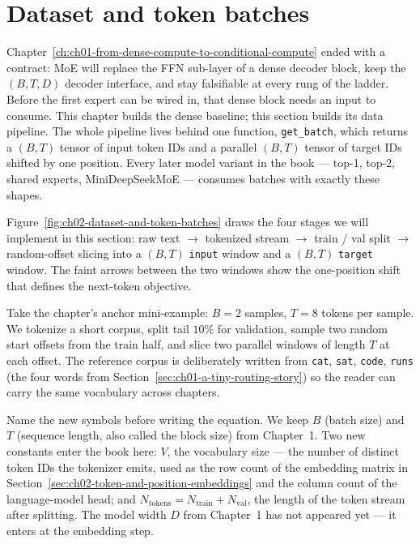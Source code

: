 \section{Dataset and token batches}
\label{sec:ch02-dataset-and-token-batches}

Chapter~\ref{ch:ch01-from-dense-compute-to-conditional-compute} ended with a contract: MoE will replace the FFN sub-layer of a dense decoder block, keep the $(B, T, D)$ decoder interface, and stay falsifiable at every rung of the ladder. Before the first expert can be wired in, that dense block needs an input to consume. This chapter builds the dense baseline; this section builds its data pipeline. The whole pipeline lives behind one function, \texttt{get\_batch}, which returns a $(B, T)$ tensor of input token IDs and a parallel $(B, T)$ tensor of target IDs shifted by one position. Every later model variant in the book --- top-1, top-2, shared experts, MiniDeepSeekMoE --- consumes batches with exactly these shapes.



Figure~\ref{fig:ch02-dataset-and-token-batches} draws the four stages we will implement in this section: raw text $\to$ tokenized stream $\to$ train / val split $\to$ random-offset slicing into a $(B, T)$ \texttt{input} window and a $(B, T)$ \texttt{target} window. The faint arrows between the two windows show the one-position shift that defines the next-token objective.

Take the chapter's anchor mini-example: $B = 2$ samples, $T = 8$ tokens per sample. We tokenize a short corpus, split tail $10\%$ for validation, sample two random start offsets from the train half, and slice two parallel windows of length $T$ at each offset. The reference corpus is deliberately written from \texttt{cat}, \texttt{sat}, \texttt{code}, \texttt{runs} (the four words from Section~\ref{sec:ch01-a-tiny-routing-story}) so the reader can carry the same vocabulary across chapters.

Name the new symbols before writing the equation. We keep $B$ (batch size) and $T$ (sequence length, also called the block size) from Chapter~1. Two new constants enter the book here: $V$, the vocabulary size --- the number of distinct token IDs the tokenizer emits, used as the row count of the embedding matrix in Section~\ref{sec:ch02-token-and-position-embeddings} and the column count of the language-model head; and $N_{\text{tokens}} = N_{\text{train}} + N_{\text{val}}$, the length of the token stream after splitting. The model width $D$ from Chapter~1 has not appeared yet --- it enters at the embedding step.

